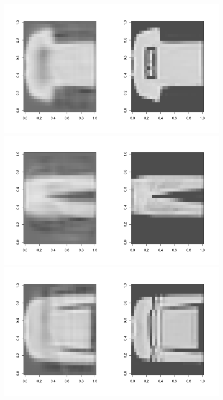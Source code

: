 \documentclass{article}
\begin{document}
\begin{figure}[H] 
\centering
\includegraphics[width=\textwidth, trim=0 0 0 5cm]{pca_reconst_0.png}
\includegraphics[width=\textwidth]{pca_reconst_1.png}
\includegraphics[width=\textwidth]{pca_reconst_2.png}
\label{fig:pca_ellipse}
\end{figure}
\end{document}
